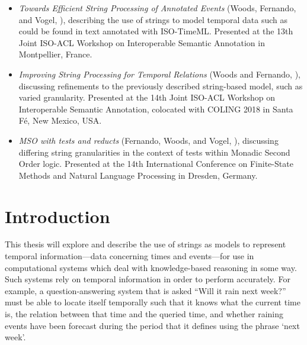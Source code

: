\documentclass[a4paper,12pt,leqno]{article}
\begin{document}
\begin{itemize}
	\item \textit{Towards Efficient String Processing of Annotated Events} (Woods, Fernando, and Vogel, \citeyear{woods2017towards}), describing the use of strings to model temporal data such as could be found in text annotated with ISO-TimeML. Presented at the 13th Joint ISO-ACL Workshop on Interoperable Semantic Annotation in Montpellier, France.
	\item \textit{Improving String Processing for Temporal Relations} (Woods and Fernando, \citeyear{woods2018improving}), discussing refinements to the previously described string-based model, such as varied granularity. Presented at the 14th Joint ISO-ACL Workshop on Interoperable Semantic Annotation, colocated with COLING 2018 in Santa F\'{e}, New Mexico, USA.
	\item \textit{MSO with tests and reducts} (Fernando, Woods, and Vogel, \citeyear{fernando2019mso}), discussing differing string granularities in the context of tests within Monadic Second Order logic. Presented at the 14th International Conference on Finite-State Methods and Natural Language Processing in Dresden, Germany.
\end{itemize}
\newpage
{}
\tableofcontents
\newpage
\listoffigures
\listoftables
\newpage
{}
\section{Introduction}\label{sec:intro}
This thesis will explore and describe the use of strings as models to represent temporal information---data concerning times and events---for use in computational systems which deal with knowledge-based reasoning in some way. Such systems rely on temporal information in order to perform accurately. For example, a question-answering system that is asked ``Will it rain next week?'' must be able to locate itself temporally such that it knows what the current time is, the relation between that time and the queried time, and whether raining events have been forecast during the period that it defines using the phrase `next week'.
\newpage
\end{document}
